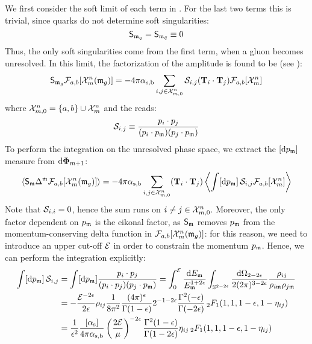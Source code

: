 We first consider the soft limit of each term in . For the last two terms this is trivial, since quarks do not determine soft singularities:
\begin{equation*}
  \mathsf{S}_{\mathfrak{m}_q} = \mathsf{S}_{\mathfrak{m}_{\bar{q}}} \equiv 0
\end{equation*}
Thus, the only soft singularities come from the first term, when a gluon becomes unresolved. In this limit, the factorization of the amplitude is found to be (see \cite{Catani-1997}):
\begin{equation}
  \mathsf{S}_{\mathfrak{m}_g} \mathcal{F}_{a,b}[\mathcal{X}^{n}_{m}(\mathfrak{m}_g)] = - 4\pi \alpha_\text{s,b} \sum_{i,j \in \mathcal{X}^{n}_{m,0}} \mathcal{S}_{i,j} (\mathbf{T}_i \cdot \mathbf{T}_j) \mathcal{F}_{a,b}[\mathcal{X}^{n}_{m}]
  \label{eq:soft-lim}
\end{equation}
where $ \mathcal{X}^{n}_{m,0} = \{a,b\} \cup \mathcal{X}^{n}_{m} $ and the  reads:
\begin{equation}
  \mathcal{S}_{i,j} \equiv \frac{p_i \cdot p_j}{(p_i \cdot p_{\mathfrak{m}}) (p_j \cdot p_{\mathfrak{m}})}
\end{equation}
To perform the integration on the unresolved phase space, we extract the $ [\mathrm{d} p_{\mathfrak{m}}] $ measure from $ \mathrm{d} \boldsymbol{\Phi}_{m+1} $:
\begin{equation*}
  \left\langle \mathsf{S}_{\mathfrak{m}} \Delta^{\mathfrak{m}} \mathcal{F}_{a,b}[\mathcal{X}^{n}_{m}(\mathfrak{m}_g)] \right\rangle = - 4\pi \alpha_\text{s,b} \sum_{i,j \in \mathcal{X}^{n}_{m,0}} (\mathbf{T}_i \cdot \mathbf{T}_j) \left\langle \int [\mathrm{d} p_{\mathfrak{m}}] \, \mathcal{S}_{i,j} \mathcal{F}_{a,b}[\mathcal{X}^{n}_{m}] \right\rangle
\end{equation*}
Note that $ \mathcal{S}_{i,i} = 0 $, hence the sum runs on $ i \neq j \in \mathcal{X}^{n}_{m,0} $. Moreover, the only factor dependent on $ p_{\mathfrak{m}} $ is the eikonal factor, as $ \mathsf{S}_{\mathfrak{m}} $ removes $ p_{\mathfrak{m}} $ from the momentum-conserving delta function in $ \mathcal{F}_{a,b}[\mathcal{X}^{n}_{m}(\mathfrak{m}_g)] $: for this reason, we need to introduce an upper cut-off $ \mathcal{E} $ in order to constrain the momentum $ p_{\mathfrak{m}} $. Hence, we can perform the integration explicitly:
\begin{equation*}
  \begin{split}
    \int [\mathrm{d} p_{\mathfrak{m}}] \, \mathcal{S}_{i,j}
    & = \int [\mathrm{d} p_{\mathfrak{m}}] \frac{p_i \cdot p_j}{(p_i \cdot p_j) (p_j \cdot p_{\mathfrak{m}})} = \int_0^{\mathcal{E}} \frac{\mathrm{d} E_{\mathfrak{m}}}{E_{\mathfrak{m}}^{1+2\epsilon}} \int_{\mathbb{S}^{2-2\epsilon}} \frac{\mathrm{d} \Omega_{2-2\epsilon}}{2(2\pi)^{3-2\epsilon}} \frac{\rho_{ij}}{\rho_{i\mathfrak{m}} \rho_{j\mathfrak{m}}} \\
    & = - \frac{\mathcal{E}^{-2\epsilon}}{2\epsilon} \rho_{ij} \frac{1}{8\pi^2} \frac{(4\pi)^\epsilon}{\Gamma(1-\epsilon)} 2^{-1-2\epsilon} \frac{\Gamma^2(-\epsilon)}{\Gamma(-2\epsilon)} \,{_2F_1}(1,1,1-\epsilon,1-\eta_{ij}) \\
    & = \frac{1}{\epsilon^2} \frac{[\alpha_\text{s}]}{4\pi \alpha_\text{s,b}} \left( \frac{2\mathcal{E}}{\mu} \right)^{-2\epsilon} \frac{\Gamma^2(1-\epsilon)}{\Gamma(1-2\epsilon)} \eta_{ij} \,{_2F_1}(1,1,1-\epsilon,1-\eta_{ij})
  \end{split}
\end{equation*}
